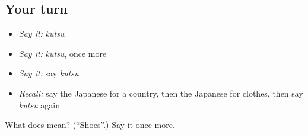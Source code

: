 \subsection*{Your turn}
\begin{itemize}
\raggedright
  \item \emph{Say it:} \emph{kutsu}
  \item \emph{Say it:} \emph{kutsu}, once more
  \item \emph{Say it:} say \emph{kutsu}
  \item \emph{Recall:} say the Japanese for a country, then the Japanese for clothes, then say \emph{kutsu} again
\end{itemize}

\begin{tcolorbox}[breakable,colback=teal!4,colframe=teal!35!black,title={Before you move on}]
What does  mean? (\textquotedblleft{}Shoes\textquotedblright{}.) Say it once more.
\end{tcolorbox}
